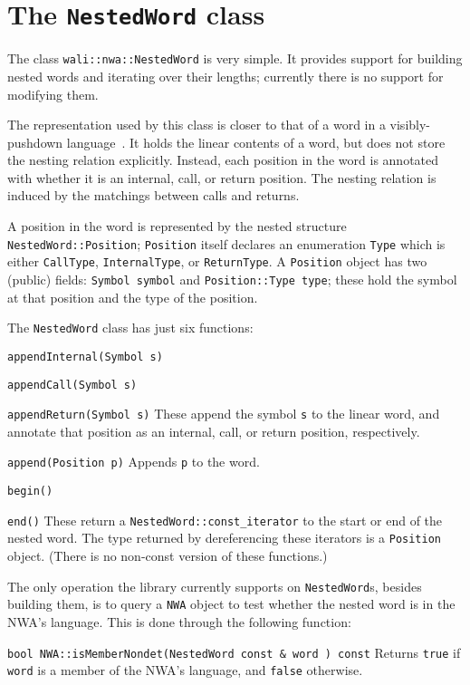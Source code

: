 \section{The \texttt{NestedWord} class}
\label{Se:class-nested-word}

The class \texttt{wali::nwa::NestedWord} is very simple. It provides support for
building nested words and iterating over their lengths; currently there
is no support for modifying them.

The representation used by this class is closer to that of a word in a
visibly-pushdown language~\cite{JACM:AM09}. It holds the linear contents of
a word, but does not store the nesting relation explicitly. Instead, each
position in the word is annotated with whether it is an internal, call, or
return position. The nesting relation is induced by the matchings between
calls and returns.

A position in the word is represented by the nested structure
\texttt{NestedWord::Position}; \texttt{Position} itself declares an
enumeration \texttt{Type} which is either \texttt{CallType},
\texttt{InternalType}, or \texttt{ReturnType}.
A \texttt{Position} object has two (public) fields: \texttt{Symbol symbol}
and \texttt{Position::Type type}; these hold the symbol at that position and
the type of the position.


The \texttt{NestedWord} class has just six functions:
\begin{description}
  \item\texttt{appendInternal(Symbol s)}
  \item\texttt{appendCall(Symbol s)}
  \item\texttt{appendReturn(Symbol s)}
    These append the symbol \texttt{s} to the linear word, and annotate that
    position as an internal, call, or return position, respectively.
  \item\texttt{append(Position p)}
    Appends \texttt{p} to the word.
  \item\texttt{begin()}
  \item\texttt{end()}
    These return a \texttt{NestedWord::const\_iterator} to the start or end
    of the nested word. The type returned by dereferencing these iterators is
    a \texttt{Position} object. (There is no non-const version of these
    functions.)
\end{description}

The only operation the library currently supports on \texttt{NestedWord}s,
besides building them, is to query a \texttt{NWA} object to test whether the
nested word is in the NWA's language. This is done through the following
function:
\begin{description}
  \item\texttt{bool NWA::isMemberNondet(NestedWord const \& word ) const}
    Returns \texttt{true} if \texttt{word} is a member of the NWA's language,
    and \texttt{false} otherwise.
\end{description}

